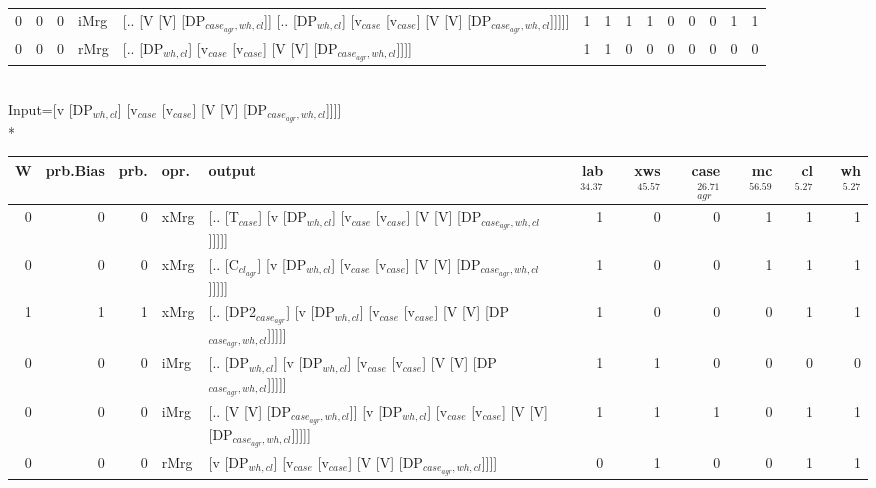 \begin{tabularx}{\linewidth}{rrrlXrrrrrrrrr}
   0 &       0 &   0 & iMrg & [.. [V [V] [DP$_{case_{agr},wh,cl}$]] [.. [DP$_{wh,cl}$] [v$_{case}$ [v$_{case}$] [V [V] [DP$_{case_{agr},wh,cl}$]]]]]                   &             1 &             1 &                  1 &            1 &              0 &                0 &             0 &        1 &        1 \\
   0 &       0 &   0 & rMrg & [.. [DP$_{wh,cl}$] [v$_{case}$ [v$_{case}$] [V [V] [DP$_{case_{agr},wh,cl}$]]]]                                                    &             1 &             1 &                  0 &            0 &              0 &                0 &             0 &        0 &        0 \\
\hline
\end{tabularx}\endgroup\\
\begingroup\scriptsize Input=[v [DP$_{wh,cl}$] [v$_{case}$ [v$_{case}$] [V [V] [DP$_{case_{agr},wh,cl}$]]]]\\*
\begin{tabularx}{\linewidth}{rrrlXrrrrrr}
\hline
   W &   prb.Bias &   prb. & opr.   & output                                                                                        &   lab$^{34.37}$ &   xws$^{45.57}$ &   case$_{agr}^{26.71}$ &   mc$^{56.59}$ &   cl$^{5.27}$ &   wh$^{5.27}$ \\
\hline
   0 &       0 &   0 & xMrg & [.. [T$_{case}$] [v [DP$_{wh,cl}$] [v$_{case}$ [v$_{case}$] [V [V] [DP$_{case_{agr},wh,cl}$]]]]]                    &             1 &             0 &                  0 &            1 &        1 &        1 \\
   0 &       0 &   0 & xMrg & [.. [C$_{cl_{agr}}$] [v [DP$_{wh,cl}$] [v$_{case}$ [v$_{case}$] [V [V] [DP$_{case_{agr},wh,cl}$]]]]]                  &             1 &             0 &                  0 &            1 &        1 &        1 \\
   1 &       1 &   1 & xMrg & [.. [DP2$_{case_{agr}}$] [v [DP$_{wh,cl}$] [v$_{case}$ [v$_{case}$] [V [V] [DP$_{case_{agr},wh,cl}$]]]]]              &             1 &             0 &                  0 &            0 &        1 &        1 \\
   0 &       0 &   0 & iMrg & [.. [DP$_{wh,cl}$] [v [DP$_{wh,cl}$] [v$_{case}$ [v$_{case}$] [V [V] [DP$_{case_{agr},wh,cl}$]]]]]                  &             1 &             1 &                  0 &            0 &        0 &        0 \\
   0 &       0 &   0 & iMrg & [.. [V [V] [DP$_{case_{agr},wh,cl}$]] [v [DP$_{wh,cl}$] [v$_{case}$ [v$_{case}$] [V [V] [DP$_{case_{agr},wh,cl}$]]]]] &             1 &             1 &                  1 &            0 &        1 &        1 \\
   0 &       0 &   0 & rMrg & [v [DP$_{wh,cl}$] [v$_{case}$ [v$_{case}$] [V [V] [DP$_{case_{agr},wh,cl}$]]]]                                  &             0 &             1 &                  0 &            0 &        1 &        1 \\
\hline
\end{tabularx}\endgroup\\
